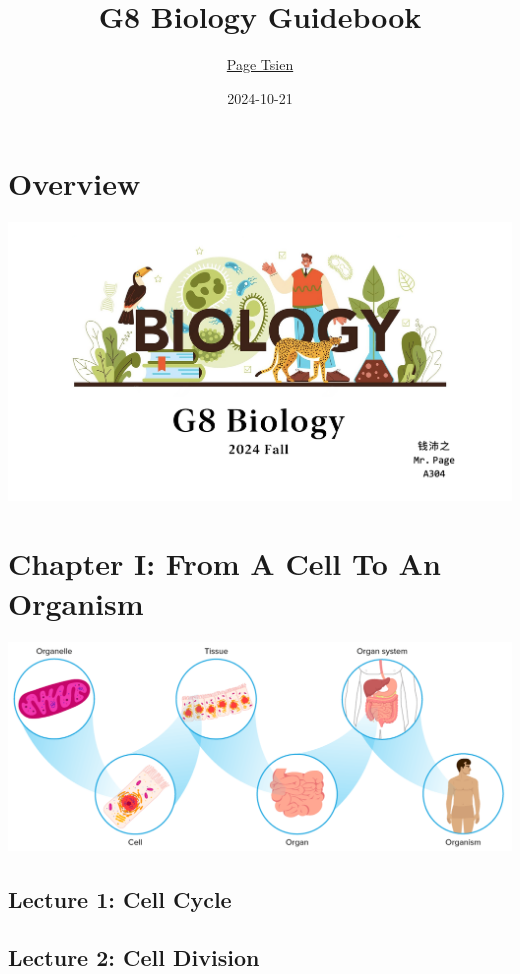 \documentclass[
]{book}
\title{G8 Biology Guidebook}
\author{\href{https://pagius5.github.io/}{Page Tsien}}
\date{2024-10-21}
\begin{document}
\maketitle

{
\setcounter{tocdepth}{1}
\tableofcontents
}
\hypertarget{overview}{%
\chapter{Overview}\label{overview}}

\includegraphics{./img/g8-bio.png}

\hypertarget{chapter-i-from-a-cell-to-an-organism}{%
\chapter{Chapter I: From A Cell To An Organism}\label{chapter-i-from-a-cell-to-an-organism}}

\includegraphics{./img/ch1.png}

\hypertarget{lecture-1-cell-cycle}{%
\section{Lecture 1: Cell Cycle}\label{lecture-1-cell-cycle}}

\hypertarget{lecture-2-cell-division}{%
\section{Lecture 2: Cell Division}\label{lecture-2-cell-division}}
\end{document}
